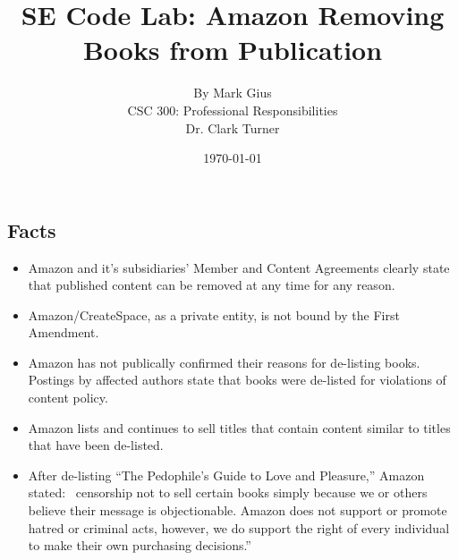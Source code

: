 \documentclass[10pt]{article}
\begin{document}
\title{\vfill SE Code Lab: Amazon Removing Books from Publication} %
\author{
By Mark Gius \vspace{10pt} \\ 
CSC 300: Professional Responsibilities  \vspace{10pt} \\ 
Dr. Clark Turner \vspace{10pt} \\ 
}
\date{\today}

\maketitle

\begin{multicols}{2}

\section{Facts}

\begin{itemize}

\item Amazon and it's subsidiaries' Member and Content Agreements clearly state that published content can be removed at any time for any reason. \cite{CreateSpaceMemberAgreement} \cite{CreateSpaceContentGuidelines} \cite{AmazonDTPContentGuidelines}

\item Amazon/CreateSpace, as a private entity, is not bound by the First Amendment.

\item Amazon has not publically confirmed their reasons for de-listing books. Postings by affected authors state that books were de-listed for violations of content policy. \cite{KittSelfPubRevolution} 

\item Amazon lists and continues to sell titles that contain content similar to titles that have been de-listed. \cite{AmazonLolitaDTPListing}

\item After de-listing ``The Pedophile's Guide to Love and Pleasure,'' Amazon stated: \ censorship not to sell certain books simply because we or others believe their message is objectionable.  Amazon does not support or promote hatred or criminal acts, however, we do support the right of every individual to make their own purchasing decisions.'' \cite{TechCrunchAmazonCensorship}


\end{itemize}
\end{multicols}
\end{document}
